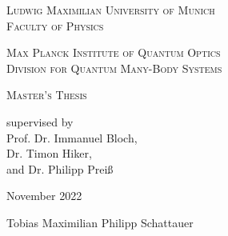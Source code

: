 \begin{titlepage}
    \vspace*{\fill}
    \centering

    \textsc{\Large Ludwig Maximilian University of Munich}\\
    \textsc{Faculty of Physics}

    \vspace{1cm}

    \textsc{\Large Max Planck Institute of Quantum Optics}\\
    \textsc{Division for Quantum Many-Body Systems}

    \vspace{2.5cm}

    \begin{doublespace}
        \makeatletter
        \textsc{ \Huge \@title}
        \makeatother
    \end{doublespace}


    \vspace{2.5cm}
    \huge \textsc{Master's Thesis}



    \vspace{0.3cm}
    \large \textrm{supervised by\\Prof. Dr. Immanuel Bloch,\\Dr. Timon Hiker,\\and Dr. Philipp Preiß}

    \vspace{1.5cm}
    \huge
    \textrm{November 2022}

    \vspace{1.5cm}
    \Large \textrm{Tobias Maximilian Philipp Schattauer}

    \vspace*{\fill}
\end{titlepage}







